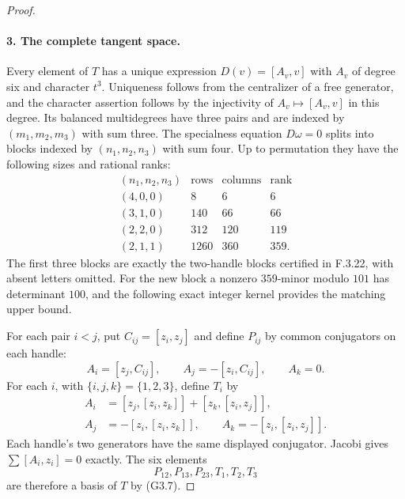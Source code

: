 \begin{proof}
\paragraph{3. The complete tangent space.}
Every element of $T$ has a unique expression
$D(v)=[A_v,v]$ with $A_v$ of degree six and character
$t^3$. Uniqueness follows from the centralizer of a
free generator, and the character assertion follows
by the injectivity of $A_v\mapsto[A_v,v]$ in this degree.
Its balanced multidegrees have three pairs and are
indexed by $(m_1,m_2,m_3)$ with sum three.
The specialness equation $D\omega=0$ splits into
blocks indexed by $(n_1,n_2,n_3)$ with sum four.
Up to permutation they have the following sizes and
rational ranks:
\[
\begin{array}{c|c|c|c}
 (n_1,n_2,n_3)&\text{rows}&\text{columns}&\text{rank}\\\hline
 (4,0,0)&8&6&6\\
 (3,1,0)&140&66&66\\
 (2,2,0)&312&120&119\\
 (2,1,1)&1260&360&359.
\end{array}                                               \tag{G3.7}
\]
The first three blocks are exactly the two-handle
blocks certified in F.3.22, with absent letters omitted.
For the new block a nonzero $359$-minor modulo $101$
has determinant $100$, and the following exact integer
kernel provides the matching upper bound.

For each pair $i<j$, put $C_{ij}=[z_i,z_j]$ and define
$P_{ij}$ by common conjugators on each handle:
\[
 A_i=[z_j,C_{ij}],\qquad A_j=-[z_i,C_{ij}],\qquad A_k=0.
\]
For each $i$, with $\{i,j,k\}=\{1,2,3\}$, define $T_i$ by
\[
 \begin{split}
 A_i&=[z_j,[z_i,z_k]]+[z_k,[z_i,z_j]],\\
 A_j&=-[z_i,[z_i,z_k]],\qquad
 A_k=-[z_i,[z_i,z_j]].
 \end{split}                                               \tag{G3.8}
\]
Each handle's two generators have the same displayed
conjugator. Jacobi gives $\sum[A_i,z_i]=0$ exactly.
The six elements
\[
                  P_{12},P_{13},P_{23},T_1,T_2,T_3
\]
are therefore a basis of $T$ by (G3.7).


\end{proof}
